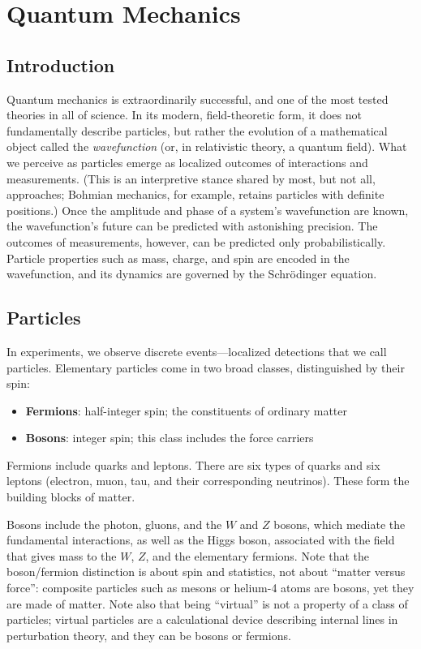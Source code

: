 \chapter{Quantum Mechanics}
\label{chap:quantum-mechanics}

\section*{Introduction}

Quantum mechanics is extraordinarily successful, and one of the most tested theories in all of science.
In its modern, field-theoretic form, it does not fundamentally describe particles, but rather the evolution of a mathematical object called the \emph{wavefunction} (or, in relativistic theory, a quantum field). 
What we perceive as particles emerge as localized outcomes of interactions and measurements.
(This is an interpretive stance shared by most, but not all, approaches; Bohmian mechanics, for example, retains particles with definite positions.)
Once the amplitude and phase of a system's wavefunction are known, the wavefunction's future can be predicted with astonishing precision. 
The outcomes of measurements, however, can be predicted only probabilistically.
Particle properties such as mass, charge, and spin are encoded in the wavefunction, and its dynamics are governed by the Schrödinger equation.


\section*{Particles}

In experiments, we observe discrete events---localized detections that we call particles. Elementary particles come in two broad classes, distinguished by their spin:

\begin{itemize}
\item \textbf{Fermions}: half-integer spin; the constituents of ordinary matter
\item \textbf{Bosons}: integer spin; this class includes the force carriers
\end{itemize}

Fermions include quarks and leptons. There are six types of quarks and six leptons (electron, muon, tau, and their corresponding neutrinos). These form the building blocks of matter.

Bosons include the photon, gluons, and the $W$ and $Z$ bosons, which mediate the fundamental interactions, as well as the Higgs boson, associated with the field that gives mass to the $W$, $Z$, and the elementary fermions. Note that the boson/fermion distinction is about spin and statistics, not about ``matter versus force'': composite particles such as mesons or helium-4 atoms are bosons, yet they are made of matter. Note also that being ``virtual'' is not a property of a class of particles; virtual particles are a calculational device describing internal lines in perturbation theory, and they can be bosons or fermions.

